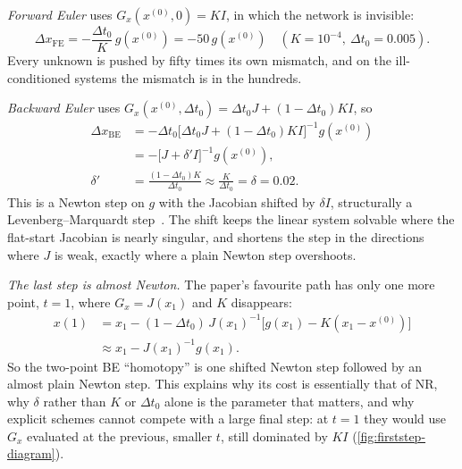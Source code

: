 \documentclass[sigconf,nonacm]{acmart}
\newcommand{\xo}{x^{(0)}}
\begin{document}
\emph{Forward Euler} uses $G_x(\xo,0)=KI$, in which the network is invisible:
\begin{equation}
  \Delta x_{\mathrm{FE}} = -\frac{\Delta t_0}{K}\,g(\xo) = -50\,g(\xo) \quad(K=10^{-4},\ \Delta t_0=0.005).
\end{equation}
Every unknown is pushed by fifty times its own mismatch, and on the ill-conditioned systems the mismatch
is in the hundreds.

\emph{Backward Euler} uses $G_x(\xo,\Delta t_0) = \Delta t_0 J + (1-\Delta t_0)KI$, so
\begin{equation}
\begin{aligned}
  \Delta x_{\mathrm{BE}} &= -\Delta t_0\bigl[\Delta t_0 J + (1-\Delta t_0)KI\bigr]^{-1} g(\xo)\\
    &= -\bigl[J + \delta' I\bigr]^{-1} g(\xo),\\
  \delta' &= \frac{(1-\Delta t_0)K}{\Delta t_0} \approx \frac{K}{\Delta t_0} = \delta = 0.02 .
\end{aligned}\label{eq:shift}
\end{equation}
This is a Newton step on $g$ with the Jacobian shifted by $\delta I$, structurally a Levenberg--Marquardt
step~\cite{levenberg1944,marquardt1963}. The shift keeps the linear system solvable where the flat-start
Jacobian is nearly singular, and shortens the step in the directions where $J$ is weak, exactly where a
plain Newton step overshoots.

\emph{The last step is almost Newton.} The paper's favourite path has only one more point, $t=1$, where
$G_x = J(x_1)$ and $K$ disappears:
\begin{equation}
\begin{aligned}
  x(1) &= x_1 - (1-\Delta t_0)\,J(x_1)^{-1}\bigl[g(x_1) - K(x_1-\xo)\bigr]\\
       &\approx x_1 - J(x_1)^{-1} g(x_1).
\end{aligned}
\end{equation}
So the two-point BE ``homotopy'' is one shifted Newton step followed by an almost plain Newton step. This
explains why its cost is essentially that of NR, why $\delta$ rather than $K$ or $\Delta t_0$ alone is the
parameter that matters, and why explicit schemes cannot compete with a large final step: at $t=1$ they
would use $G_x$ evaluated at the previous, smaller $t$, still dominated by $KI$ (\cref{fig:firststep-diagram}).
\end{document}
